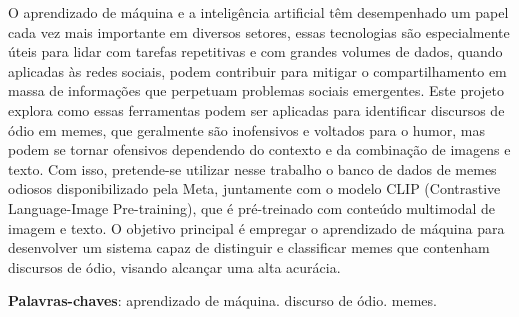 \setlength{\absparsep}{18pt} %
\begin{resumo}

O aprendizado de máquina e a inteligência artificial têm desempenhado um papel cada vez mais importante em diversos setores, essas tecnologias são especialmente úteis para lidar com tarefas repetitivas e com grandes volumes de dados, quando aplicadas às redes sociais, podem contribuir para mitigar o compartilhamento em massa de informações que perpetuam problemas sociais emergentes. Este projeto explora como essas ferramentas podem ser aplicadas para identificar discursos de ódio em memes, que geralmente são inofensivos e voltados para o humor, mas podem se tornar ofensivos dependendo do contexto e da combinação de imagens e texto. Com isso, pretende-se utilizar nesse trabalho o banco de dados de memes odiosos disponibilizado pela Meta, juntamente com o modelo CLIP (Contrastive Language-Image Pre-training), que é pré-treinado com conteúdo multimodal de imagem e texto. O objetivo principal é empregar o aprendizado de máquina para desenvolver um sistema capaz de distinguir e classificar memes que contenham discursos de ódio, visando alcançar uma alta acurácia.


 \textbf{Palavras-chaves}: aprendizado de máquina. discurso de ódio. memes.
\end{resumo}



 

